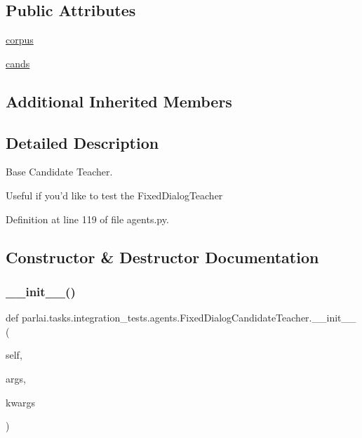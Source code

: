 \subsection*{Public Attributes}
\begin{DoxyCompactItemize}
\item 
\hyperlink{classparlai_1_1tasks_1_1integration__tests_1_1agents_1_1FixedDialogCandidateTeacher_aaa3a67fc9e86da10a8d3f8cc9baa8348}{corpus}
\item 
\hyperlink{classparlai_1_1tasks_1_1integration__tests_1_1agents_1_1FixedDialogCandidateTeacher_a46d2bbf92e60f81a46443e4faf252a18}{cands}
\end{DoxyCompactItemize}
\subsection*{Additional Inherited Members}


\subsection{Detailed Description}
\begin{DoxyVerb}Base Candidate Teacher.

Useful if you'd like to test the FixedDialogTeacher
\end{DoxyVerb}
 

Definition at line 119 of file agents.\+py.



\subsection{Constructor \& Destructor Documentation}
\mbox{\label{classparlai_1_1tasks_1_1integration__tests_1_1agents_1_1FixedDialogCandidateTeacher_a021aef445504c6ff646501dc665e1362}} 
\subsubsection{\texorpdfstring{\+\_\+\+\_\+init\+\_\+\+\_\+()}{\_\_init\_\_()}}
{\footnotesize\ttfamily def parlai.\+tasks.\+integration\+\_\+tests.\+agents.\+Fixed\+Dialog\+Candidate\+Teacher.\+\_\+\+\_\+init\+\_\+\+\_\+ (\begin{DoxyParamCaption}\item[{}]{self,  }\item[{}]{args,  }\item[{}]{kwargs }\end{DoxyParamCaption})}

